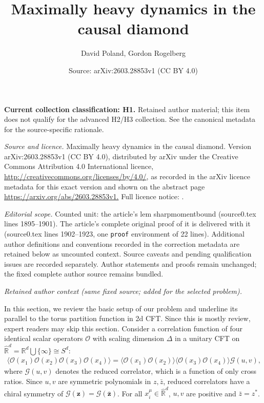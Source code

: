 \documentclass[10pt,a4paper]{amsart}
\title{Maximally heavy dynamics in the causal diamond}
\author{David Poland, Gordon Rogelberg}
\date{Source: arXiv:2603.28853v1 (CC BY 4.0)}
\newcommand{\De}{\Delta}
\newcommand{\ba}{\begin{equation} \begin{aligned}}
\newcommand{\bs}[1]{\boldsymbol{#1}}
\newcommand{\ea}{\end{aligned} \end{equation}}
\newcommand{\cO}{\mathcal O}
\begin{document}
\maketitle
\par\medskip\noindent\textbf{Current collection classification: H1.} Retained author material; this item does not qualify for the advanced H2/H3 collection. See the canonical metadata for the source-specific rationale.\par\medskip


{\sloppy \noindent\emph{Source and licence.} Maximally heavy dynamics in the causal diamond. Version arXiv:2603.28853v1 (CC BY 4.0), distributed by arXiv under the Creative Commons Attribution 4.0 International licence, \url{http://creativecommons.org/licenses/by/4.0/}, as recorded in the arXiv licence metadata for this exact version and shown on the abstract page \url{https://arxiv.org/abs/2603.28853v1.} Full licence notice: .\par\smallskip\par}

\noindent\textit{Editorial scope.} Counted unit: the article's lem sharpmomentbound (source0.tex lines 1895--1901). The article's complete original proof of it is delivered with it (source0.tex lines 1902--1923, one \texttt{proof} environment of 22 lines). Additional author definitions and conventions recorded in the correction metadata are retained below as uncounted context. Source caveats and pending qualification issues are recorded separately. Author statements and proofs remain unchanged; the fixed complete author source remains bundled.\par\medskip
\par\medskip\noindent\textit{Retained author context (same fixed source; added for the selected problem).}\par
In this section, we review the basic setup of our problem and underline its parallel to the torus partition function in 2d CFT. Since this is mostly review, expert readers may skip this section. Consider a correlation function of four identical scalar operators $\cO$ with scaling dimension $\De$ in a unitary CFT on $\widehat{\mathbb{R}}^d =  \mathbb{R}^d\bigcup\{\infty\} \cong S^d $:
\ba
\langle \cO(x_1) \cO(x_2) \cO(x_3) \cO(x_4)\rangle = \langle \cO(x_1) \cO(x_2) \rangle \langle \cO(x_3) \cO(x_4) \rangle \mathcal{G}(u,v),
\label{cft4ptfunction}
\ea
where $\mathcal{G}(u,v)$ denotes the reduced correlator, which is a function of only cross ratios. Since $u,v$ are symmetric polynomials in $z,\bar{z}$, reduced correlators have a chiral symmetry of $\mathcal{G}(\bs{z}) = \mathcal{G}(\bar{\bs{z}})$. For all $x^\mu_i \in \widehat{\mathbb{R}}^d$, $u,v$ are positive and $\bar{z} = z^*$.
\end{document}
